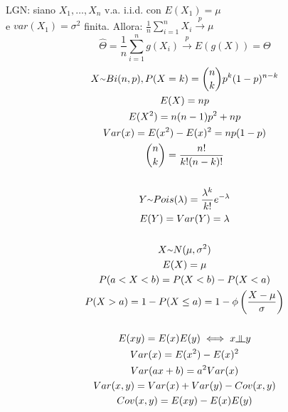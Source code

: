 \documentclass[italian]{article}
\author{Giacomo De Liberali}
\newcommand{\tildepes}{{\raise.17ex\hbox{$\scriptstyle\mathtt{\sim}$}}}
\newcommand{\indep}{\rotatebox[origin=c]{90}{$\models$}}
\begin{document}
	LGN: siano $X_1,\dots,X_n$ v.a. i.i.d. con $E(X_1) = \mu$ \\
	e $var(X_1) = \sigma^2$ finita. Allora:  $\frac{1}{n}\sum_{i=1}^{n}X_i \xrightarrow{p} \mu$\\
	\[
		\hat{\varTheta} = \frac{1}{n}\sum_{i=1}^{n}g(X_i) \xrightarrow{p} E(g(X)) = \varTheta
	\]
	\begin{gather*}
		X \tildepes Bi(n,p), P(X=k) = \binom{n}{k}p^k(1-p)^{n-k} \\
		E(X) = np \\
		 E(X^2) = n(n-1)p^2+np \\
		Var(x) =  E(x^2) - E(x)^2 = np(1-p)  \\
		\binom{n}{k} = \frac{n!}{k!(n-k)!} \\\\
		Y \tildepes Pois(\lambda) = \frac{\lambda^k}{k!}e^{-\lambda} \\
		E(Y) = Var(Y) = \lambda \\\\
		X \tildepes N(\mu,\sigma^2) \\
		E(X) = \mu \\
		P(a < X < b) = P(X < b) - P(X < a) \\
		P(X > a) = 1 - P(X \leq a) = 1 - \phi\left(\frac{X - \mu}{\sigma}\right) \\\\
		E(xy) = E(x)E(y) \iff x \indep y \\
		Var(x) = E(x^2) - E(x)^2 \\
		Var(ax + b) = a^2Var(x) \\
		Var(x,y) = Var(x) + Var(y) - Cov(x,y) \\
		Cov(x,y) = E(xy) - E(x)E(y)
	\end{gather*}
\end{document}
